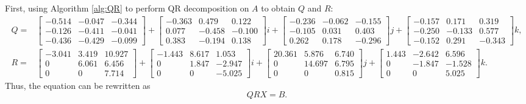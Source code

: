 \documentclass{book}
\theoremstyle{remark}
\begin{document}
\begin{multicols}{2}
First, using Algorithm \ref{alg:QR} to perform QR decomposition on $A$ to obtain $Q$ and $R:$
\setlength{\jot}{2pt}
\setlength{\arraycolsep}{1pt}
{\footnotesize
\begin{align*}
  Q =
    & \begin{bmatrix}
    -0.514 & -0.047 & -0.344 \\
    -0.126 & -0.411 & -0.041 \\
    -0.436 & -0.429 & -0.099
    \end{bmatrix} +
    \begin{bmatrix}
    -0.363 &  0.479 &  0.122 \\
     0.077 & -0.458 & -0.100 \\
     0.383 & -0.194 &  0.138
    \end{bmatrix} i
    + 
    \begin{bmatrix}
    -0.236 & -0.062 & -0.155 \\
    -0.105 &  0.031 &  0.403 \\
     0.262 &  0.178 & -0.296
    \end{bmatrix} j +
    \begin{bmatrix}
    -0.157 &  0.171 &  0.319 \\
    -0.250 & -0.133 &  0.577 \\
    -0.152 &  0.291 & -0.343
    \end{bmatrix} k,\\
  R =
    & \begin{bmatrix}
    -3.041 & 3.419 & 10.927 \\
     0     & 6.061 & 6.456 \\
     0     & 0     & 7.714
    \end{bmatrix} +
    \begin{bmatrix}
    -1.443 & 8.617 &  1.053 \\
     0     & 1.847 & -2.947 \\
     0     & 0     & -5.025
    \end{bmatrix} i
    + 
    \begin{bmatrix}
    20.361 & 5.876  & 6.740 \\
     0     & 14.697 & 6.795 \\
     0     & 0      & 0.815
    \end{bmatrix} j +
    \begin{bmatrix}
    1.443 & -2.642 &  6.596 \\
    0     & -1.847 & -1.528 \\
    0     &  0     &  5.025
    \end{bmatrix} k.
\end{align*}
}
Thus, the equation can be rewritten as
\begin{equation}
    QRX = B.\label{eq:example1}
\end{equation}


\end{multicols}
\end{document}
